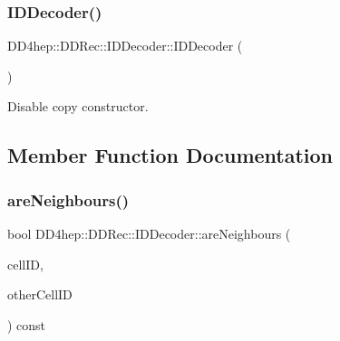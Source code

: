 \hypertarget{class_d_d4hep_1_1_d_d_rec_1_1_i_d_decoder_a428873f9f3597175d44b1e150ebf84e8}{}\label{class_d_d4hep_1_1_d_d_rec_1_1_i_d_decoder_a428873f9f3597175d44b1e150ebf84e8} 
\subsubsection{\texorpdfstring{I\+D\+Decoder()}{IDDecoder()}\hspace{0.1cm}{\footnotesize\ttfamily [2/2]}}
{\footnotesize\ttfamily D\+D4hep\+::\+D\+D\+Rec\+::\+I\+D\+Decoder\+::\+I\+D\+Decoder (\begin{DoxyParamCaption}\item[{const \hyperlink{class_d_d4hep_1_1_d_d_rec_1_1_i_d_decoder}{I\+D\+Decoder} \&}]{ }\end{DoxyParamCaption})\hspace{0.3cm}{\ttfamily [private]}}



Disable copy constructor. 



\subsection{Member Function Documentation}
\hypertarget{class_d_d4hep_1_1_d_d_rec_1_1_i_d_decoder_aede1052576f386f89d1ecd1ecc184bd8}{}\label{class_d_d4hep_1_1_d_d_rec_1_1_i_d_decoder_aede1052576f386f89d1ecd1ecc184bd8} 
\subsubsection{\texorpdfstring{are\+Neighbours()}{areNeighbours()}}
{\footnotesize\ttfamily bool D\+D4hep\+::\+D\+D\+Rec\+::\+I\+D\+Decoder\+::are\+Neighbours (\begin{DoxyParamCaption}\item[{const \hyperlink{namespace_d_d4hep_1_1_d_d_rec_af5cecc2e566eeaedb430b92df23971d4}{Cell\+ID} \&}]{cell\+ID,  }\item[{const \hyperlink{namespace_d_d4hep_1_1_d_d_rec_af5cecc2e566eeaedb430b92df23971d4}{Cell\+ID} \&}]{other\+Cell\+ID }\end{DoxyParamCaption}) const}



